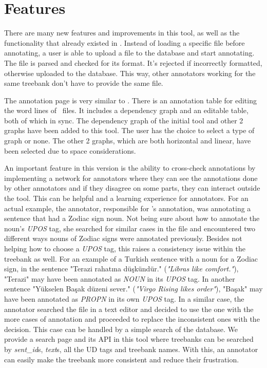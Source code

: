 \section{Features}
\label{sec:features}

There are many new features and improvements in this tool, as well as the functionality that already existed in \boatvone.
Instead of loading a specific file before annotating, a user is able to upload a \conllu{} file to the database and start annotating.
The file is parsed and checked for its format. It's rejected if incorrectly formatted, otherwise uploaded to the database.
This way, other annotators working for the same treebank don't have to provide the same file.

The annotation page is very similar to \boatvone.
There is an annotation table for editing the word lines of \conllu\ files.
It includes a dependency graph and an editable table, both of which in sync.
The dependency graph of the initial tool and other 2 graphs have been added to this tool.
The user has the choice to select a type of graph or none.
The other 2 graphs, which are both horizontal and linear, have been selected due to space considerations.

An important feature in this version is the ability to cross-check annotations by implementing a network for annotators where they can see the annotations done by other annotators and if they disagree on some parts, they can interact outside the tool.
This can be helpful and a learning experience for annotators.
For an actual example, the annotator, responsible for \bountreebank{}'s annotation, was annotating a sentence that had a Zodiac sign noun.
Not being sure about how to annotate the noun's \textit{UPOS} tag, she searched for similar cases in the \conllu{} file and encountered two different ways nouns of Zodiac signs were annotated previously.
Besides not helping how to choose a \textit{UPOS} tag, this raises a consistency issue within the treebank as well.
For an example of a Turkish sentence with a noun for a Zodiac sign, in the sentence "Terazi rahatına düşkündür." (\textit{"Libras like comfort."}), "Terazi" may have been annotated as \textit{NOUN} in its \textit{UPOS} tag.
In another sentence "Yükselen Başak düzeni sever." (\textit{"Virgo Rising likes order"}), "Başak" may have been annotated as \textit{PROPN} in its own \textit{UPOS} tag.
In a similar case, the annotator searched the \conllu{} file in a text editor and decided to use the one with the more cases of annotation and proceeded to replace the inconsistent ones with the decision.
This case can be handled by a simple search of the database.
We provide a search page and its API in this tool where treebanks can be searched by \textit{sent\_id}s, \textit{text}s, all the UD tags and treebank names.
With this, an annotator can easily make the treebank more consistent and reduce their frustration.

